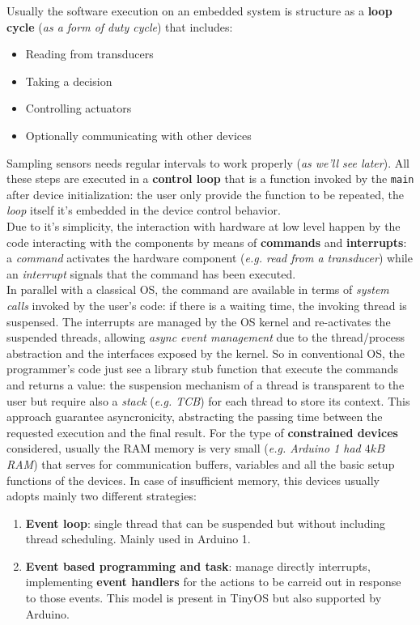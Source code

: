 \documentclass[10pt,a4paper]{report}
\theoremstyle{definition}
\begin{document}
Usually the software execution on an embedded system is structure as a \textbf{loop cycle} (\textit{as a form of duty cycle}) that includes:
\begin{itemize}
	\item 
	Reading from transducers
	\item 
	Taking a decision
	\item 
	Controlling actuators
	\item 
	Optionally communicating with other devices

\end{itemize}
Sampling sensors needs regular intervals to work properly (\textit{as we'll see later}).
All these steps are executed in a \textbf{control loop} that is a function invoked by the \texttt{main} after device initialization: the user only provide the function to be repeated, the \textit{loop} itself it's embedded in the device control behavior.\\
Due to it's simplicity, the interaction with hardware at low level happen by the code interacting with the components by means of \textbf{commands} and \textbf{interrupts}: a \textit{command} activates the hardware component (\textit{e.g. read from a transducer}) while an \textit{interrupt} signals that the command has been executed. \\
In parallel with a classical OS, the command are available in terms of \textit{system calls} invoked by the user's code: if there is a waiting time, the invoking thread is suspensed. The interrupts are managed by the OS kernel and re-activates the suspended threads, allowing \textit{async event management} due to the thread/process abstraction and the interfaces exposed by the kernel.
So in conventional OS, the programmer's code just see a library stub function that execute the commands and returns a value: the suspension mechanism of a thread is transparent to the user but require also a \textit{stack} (\textit{e.g. TCB}) for each thread to store its context. This approach guarantee asyncronicity, abstracting the passing time between the requested execution and the final result.
For the type of \textbf{constrained devices} considered, usually the RAM memory is very small  (\textit{e.g. Arduino 1 had $4kB$ RAM}) that serves for communication buffers, variables and all the basic setup functions of the devices.
In case of insufficient memory, this devices usually adopts mainly two different strategies:
\begin{enumerate}
	\item 
	\textbf{Event loop}: single thread that can be suspended but without including thread scheduling. Mainly used in Arduino 1.
	\item 
	\textbf{Event based programming and task}: manage directly interrupts, implementing \textbf{event handlers} for the actions to be carreid out in response to those events. This model is present in TinyOS but also supported by Arduino.
\end{enumerate}
\end{document}
